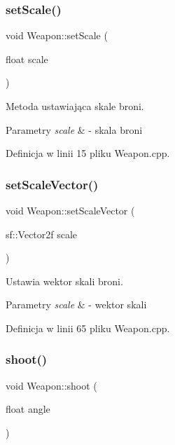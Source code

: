 \subsubsection{\texorpdfstring{set\+Scale()}{setScale()}}
{\footnotesize\ttfamily void Weapon\+::set\+Scale (\begin{DoxyParamCaption}\item[{float}]{scale }\end{DoxyParamCaption})}



Metoda ustawiająca skale broni. 


\begin{DoxyParams}{Parametry}
{\em scale} & -\/ skala broni \\
\hline
\end{DoxyParams}


Definicja w linii 15 pliku Weapon.\+cpp.

\mbox{\label{class_weapon_afc47346b4e4f0f41599fdaec6c47ae6d}} 
\subsubsection{\texorpdfstring{set\+Scale\+Vector()}{setScaleVector()}}
{\footnotesize\ttfamily void Weapon\+::set\+Scale\+Vector (\begin{DoxyParamCaption}\item[{sf\+::\+Vector2f}]{scale }\end{DoxyParamCaption})}



Ustawia wektor skali broni. 


\begin{DoxyParams}{Parametry}
{\em scale} & -\/ wektor skali \\
\hline
\end{DoxyParams}


Definicja w linii 65 pliku Weapon.\+cpp.

\mbox{\label{class_weapon_a954c06c805704aeea451f88221e5c74c}} 
\subsubsection{\texorpdfstring{shoot()}{shoot()}}
{\footnotesize\ttfamily void Weapon\+::shoot (\begin{DoxyParamCaption}\item[{float}]{angle }\end{DoxyParamCaption})\hspace{0.3cm}{\ttfamily [virtual]}}



